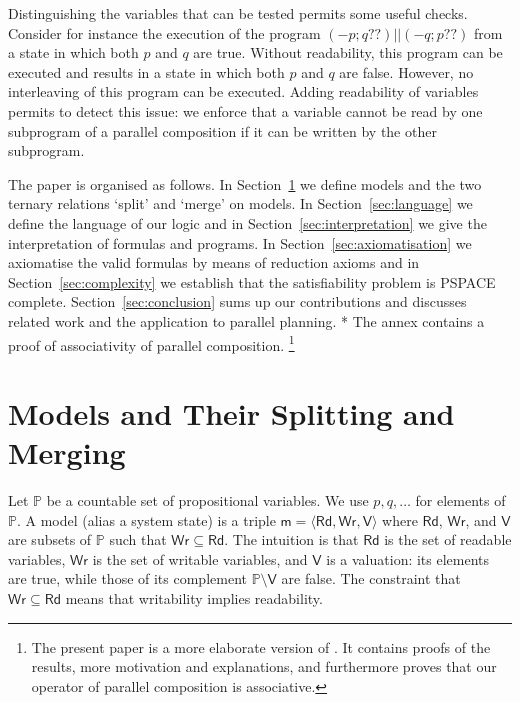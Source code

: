 \documentclass{llncs}
\newcommand{\atmset}{\mathtt{\mathbb X}}	%
\newcommand{\modl}{\mathsf m}
\newcommand{\pll}{ {||} }							%
\newcommand{\readable}[1]{\mathtt{r}_{#1}}
\newcommand{\readset}{\mathsf{Rd}}
\newcommand{\valuset}{\mathsf{V}}
\newcommand{\writable}[1]{\mathtt{w}_{#1}}
\newcommand{\writeset}{\mathsf{Wr}}
\newcommand{\testendo}{?\!\!?}			%
\newcommand{\ah}[1]{\**\marginpar{\textbf{AH:} #1}}
\newcommand{\assgnbotV}[1]{{\mathtt {-} #1}}
\newcommand{\propset}{\mathbb P}
\newcommand{\tuple}[1]{ \langle #1 \rangle}
\begin{document}
Distinguishing the variables that can be tested %
permits some useful checks.
Consider for instance the execution of the program $\left(\assgnbotV p ; q \testendo \right) \pll \left(\assgnbotV q ; p \testendo\right)$
from a state in which both $p$ and $q$ are true.
Without readability, this program can be executed and results in a state in which both $p$ and $q$ are false.
However, no interleaving of this program can be executed.
Adding readability of variables permits to detect this issue:
we enforce that a variable cannot be read by one subprogram of a parallel composition if it can be written by the other subprogram.

The paper is organised as follows.
In Section~\ref{sec:models} we define models and the two ternary relations `split' and `merge' on models. 
In Section~\ref{sec:language} we define the language of our logic and 
in Section~\ref{sec:interpretation} we give the interpretation of formulas and programs. 
In Section~\ref{sec:axiomatisation} we axiomatise the valid formulas by means of reduction axioms and
in Section~\ref{sec:complexity} we establish that the satisfiability problem is PSPACE complete. 
Section~\ref{sec:conclusion} sums up our contributions and discusses related work and the application to parallel planning. 
\ah{
reste ajoute
}
The annex contains a proof of associativity of parallel composition. 
\footnote{
The present paper is a more elaborate version of %
\cite{DBLP:conf/tap/BoudouHT19}. 
It contains proofs of the results, more motivation and explanations, and furthermore proves that our operator of parallel composition is associative. 
}


\section{Models and Their Splitting and Merging }\label{sec:models} 

Let $\propset$ be a countable set of propositional variables. 
We use $p, q,\ldots$ for elements of $\propset$. 
A model (alias a system state) is a %
triple $\modl = \tuple{\readset,\writeset,\valuset}$ 
where $\readset$, $\writeset$, and $\valuset$ are subsets of $\propset$ such that $\writeset \subseteq \readset$. 
The intuition is that $\readset$ is the set of readable variables, $\writeset$ is the set of writable variables, and $\valuset$ is a valuation: 
its elements are true, while those of its complement $\propset \setminus \valuset$ are false. 
The constraint that $\writeset \subseteq \readset$ means that writability implies readability. 
\end{document}
